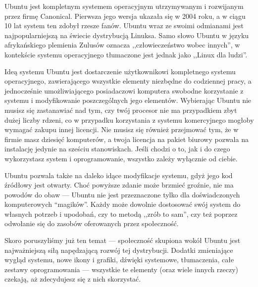 Ubuntu jest kompletnym systemem operacyjnym utrzymywanym i rozwijanym przez firmę Canonical. Pierwsza jego wersja ukazała się w 2004 roku, a w ciągu 10 lat system ten zdobył rzesze fanów. Ubuntu wraz ze swoimi odmianami jest najpopularniejszą na świecie dystrybucją Linuksa. Samo słowo Ubuntu w języku afrykańskiego plemienia Zulusów oznacza ,,człowieczeństwo wobec innych'', w kontekście systemu operacyjnego tłumaczone jest jednak jako ,,Linux dla ludzi''.

Ideą systemu Ubuntu jest dostarczenie użytkownikowi kompletnego systemu operacyjnego, zawierającego wszystkie elementy niezbędne do codziennej pracy, a jednocześnie umożliwiającego posiadaczowi komputera swobodne korzystanie z systemu i modyfikowanie poszczególnych jego elementów. Wybierając Ubuntu nie musisz się zastanawiać nad tym, czy twój procesor nie ma przypadkiem zbyt dużej liczby rdzeni, co w przypadku korzystania z systemu komercyjnego mogłoby wymagać zakupu innej licencji. Nie musisz się również przejmować tym, że w firmie masz dziesięć komputerów, a twoja licencja na pakiet biurowy pozwala na instalację jedynie na sześciu stanowiskach. Jeśli chodzi o to, jak i do czego wykorzystasz system i oprogramowanie, wszystko zależy wyłącznie od ciebie.

Ubuntu pozwala także na daleko idące modyfikacje systemu, gdyż jego kod źródłowy jest otwarty. Choć powyższe zdanie może brzmieć groźnie, nie ma powodów do obaw --- Ubuntu nie jest przeznaczone tylko dla doświadczonych komputerowych “magików”. Każdy może dowolnie dostosować swój system do własnych potrzeb i upodobań, czy to metodą ,,zrób to sam'', czy też poprzez odwołanie się do zasobów oferowanych przez społeczność.

Skoro poruszyliśmy już ten temat --- społeczność skupiona wokół Ubuntu jest najważniejszą siłą napędzającą rozwój tej dystrybucji. Dodatki zmieniające wygląd systemu, nowe ikony i grafiki, dźwięki systemowe, tłumaczenia, całe zestawy oprogramowania --- wszystkie te elementy (oraz wiele innych rzeczy) czekają, aż zdecydujesz się z nich skorzystać.
